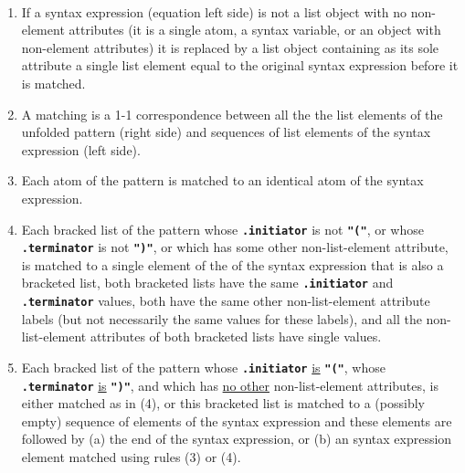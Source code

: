 \documentclass[12pt]{article}
\newcommand{\TT}[1]{{\tt \bfseries #1}}
\newcommand{\ikey}[2]{{\bf \em #1}\index{#2}}
\newenvironment{indpar}[1][0.3in]%
	{\begin{list}{}%
		     {\setlength{\itemsep}{0in}%
		      \setlength{\topsep}{0in}%
		      \setlength{\parsep}{1ex}%
		      \setlength{\labelwidth}{#1}%
		      \setlength{\leftmargin}{#1}%
		      \addtolength{\leftmargin}{\labelsep}}%
	 \item}%
	{\end{list}}
\begin{document}
\begin{indpar}
\begin{list}{}{}
\item[\ikey{Pattern Matching Rules}%
           {pattern matching rules}%
	   \index{matching rules}%
	   \label{PATTERN-MATCHING-RULES}:]~

\begin{enumerate}

\item If a syntax expression (equation left side) is not a list
object with no non-element attributes (it is a single atom, a
syntax variable, or an object with non-element attributes)
it is replaced by a list object containing as its
sole attribute a single list element equal to the original syntax expression
before it is matched.

\item A matching is a 1-1 correspondence between all the the list elements of
the unfolded pattern (right side)
and sequences of list elements of the syntax expression (left side).

\item Each atom of the pattern is matched to an identical atom of the
syntax expression.

\item Each bracked list of the pattern whose \TT{.initiator} is not
\TT{"("}, or whose \TT{.ter\-min\-a\-tor} is not \TT{")"}, or which has
some other non-list-element attribute,
is match\-ed to a single element of the of the syntax expression
that is also a bracketed list, both bracketed lists have the same
\TT{.initiator} and \TT{.terminator} values, both have the same
other non-list-element attribute labels (but not necessarily the
same values for these labels), and all the non-list-element attributes
of both bracketed lists have single values.

\item Each bracked list of the pattern whose \TT{.initiator} \underline{is}
\TT{"("}, whose \TT{.ter\-min\-a\-tor} \underline{is} \TT{")"},
and which has \underline{no other} non-list-element attributes,
is either matched as in (4), or this bracketed list
is matched to a (possibly empty)
sequence of elements of the syntax expression and these elements are
followed by (a) the end of the syntax expression, or (b)
an syntax expression element matched using rules (3) or (4).

\end{enumerate}

\end{list}
\end{indpar}
\end{document}
